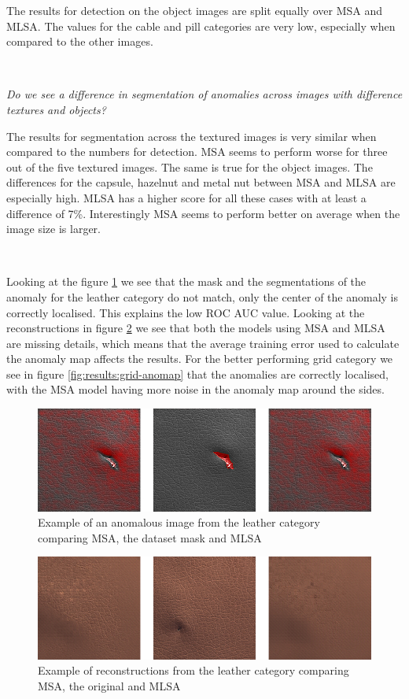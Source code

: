 The results for detection on the object images are split equally over MSA and MLSA. The values for the cable and pill categories are very low, especially when compared to the other images. 

\

\textit{Do we see a difference in segmentation of anomalies across images with difference textures and objects?}

The results for segmentation across the textured images is very similar when compared to the numbers for detection. MSA seems to perform worse for three out of the five textured images. The same is true for the object images. The differences for the capsule, hazelnut and metal nut between MSA and MLSA are especially high. MLSA has a higher score for all these cases with at least a difference of 7\%. Interestingly MSA seems to perform better on average when the image size is larger.

\

Looking at the figure \ref{fig:results:leather-anomap} we see that the mask and the segmentations of the anomaly for the leather category do not match, only the center of the anomaly is correctly localised. This explains the low ROC AUC value. Looking at the reconstructions in figure \ref{fig:results:leather-recon} we see that both the models using MSA and MLSA are missing details, which means that the average training error used to calculate the anomaly map affects the results. For the better performing grid category we see in figure \ref{fig:results:grid-anomap} that the anomalies are correctly localised, with the MSA model having more noise in the anomaly map around the sides.

\begin{figure}[ht!]
\centering
\includegraphics[width=\textwidth]{imgs/samples/leather_cut_anomap.jpg}
\caption{Example of an anomalous image from the leather category comparing MSA, the dataset mask and MLSA}
\label{fig:results:leather-anomap}
\end{figure}

\begin{figure}[ht!]
\centering
\includegraphics[width=\textwidth]{imgs/samples/leather_poke_recon.jpg}
\caption{Example of reconstructions from the leather category comparing MSA, the original and MLSA}
\label{fig:results:leather-recon}
\end{figure}

